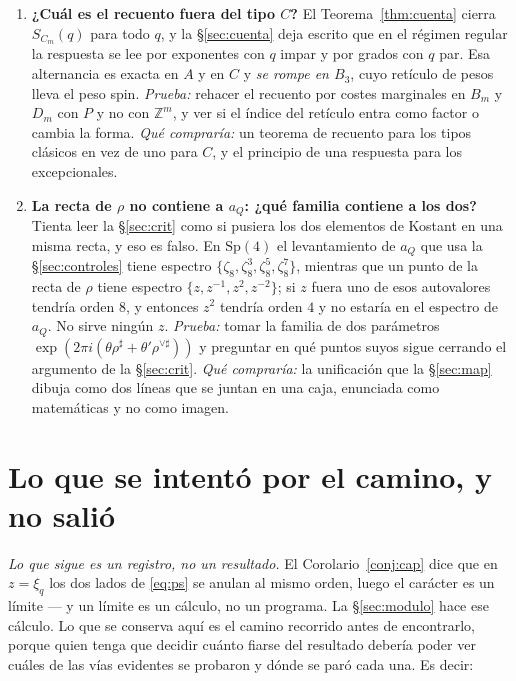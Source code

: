 \documentclass[11pt,a4paper]{article}
\newcommand{\Sp}{\mathrm{Sp}}
\begin{document}
\begin{enumerate}
\item \textbf{¿Cuál es el recuento fuera del tipo $C$?}
El Teorema~\ref{thm:cuenta} cierra $S_{C_m}(q)$ para todo $q$, y la \S\ref{sec:cuenta} deja escrito
que en el régimen regular la respuesta se lee por exponentes con $q$ impar y por grados con $q$ par.
Esa alternancia es exacta en $A$ y en $C$ y \emph{se rompe en $B_3$}, cuyo retículo de pesos lleva el
peso spin. \emph{Prueba:} rehacer el recuento por costes marginales en $B_m$ y $D_m$ con $P$ y no con
$\mathbb{Z}^m$, y ver si el índice del retículo entra como factor o cambia la forma. \emph{Qué compraría:}
un teorema de recuento para los tipos clásicos en vez de uno para $C$, y el principio de una
respuesta para los excepcionales.

\item \textbf{La recta de $\rho$ no contiene a $a_Q$: ¿qué familia contiene a los dos?}
Tienta leer la \S\ref{sec:crit} como si pusiera los dos elementos de Kostant en una misma recta, y
eso es falso. En $\Sp(4)$ el levantamiento de $a_Q$ que usa la \S\ref{sec:controles} tiene espectro
$\{\zeta_8,\zeta_8^3,\zeta_8^5,\zeta_8^7\}$, mientras que un punto de la recta de $\rho$ tiene
espectro $\{z,z^{-1},z^2,z^{-2}\}$; si $z$ fuera uno de esos autovalores tendría orden $8$, y
entonces $z^2$ tendría orden $4$ y no estaría en el espectro de $a_Q$. No sirve ningún $z$.
\emph{Prueba:} tomar la familia de dos parámetros
$\exp(2\pi i(\theta\rho^\sharp+\theta'\rho^{\vee\sharp}))$ y preguntar en qué puntos suyos sigue
cerrando el argumento de la \S\ref{sec:crit}. \emph{Qué compraría:} la unificación que la
\S\ref{sec:map} dibuja como dos líneas que se juntan en una caja, enunciada como matemáticas y no
como imagen.

\end{enumerate}

\appendix
\section{Lo que se intentó por el camino, y no salió}\label{sec:cierre}

\noindent \emph{Lo que sigue es un registro, no un resultado.} El Corolario~\ref{conj:cap} dice que
en $z=\xi_q$ los dos lados de \eqref{eq:ps} se anulan al mismo orden, luego el carácter es un límite
--- y un límite es un cálculo, no un programa. La \S\ref{sec:modulo} hace ese cálculo. Lo que se
conserva aquí es el camino recorrido antes de encontrarlo, porque quien tenga que decidir cuánto
fiarse del resultado debería poder ver cuáles de las vías evidentes se probaron y dónde se paró
cada una. Es decir:
\end{document}
